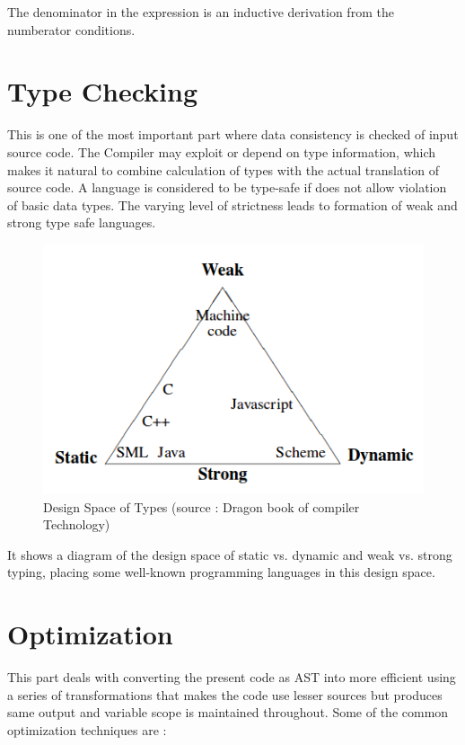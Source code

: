 The denominator in the expression is an inductive derivation from the numberator conditions.

\section{Type Checking}
This is one of the most important part where data consistency is checked of input source code. The Compiler may exploit or depend on type information, which makes it natural to combine calculation of types with the actual translation of source code. A language is considered to be type-safe if does not allow violation of basic data types. The varying level of strictness leads to formation of weak and strong type safe languages.\\

\begin{figure}[!htb]
\centering
  \includegraphics[scale=0.5]{type_check}
  \caption{Design Space of Types (source : Dragon book of compiler Technology)}
\end{figure}

It shows a diagram of the design space of static vs. dynamic and weak vs. strong typing, placing some well-known programming languages in this design space.

\section{Optimization}

This part deals with converting the present code as AST into more efficient using a series of transformations that makes the code use lesser sources but produces same output and variable scope is maintained throughout. Some of the common optimization techniques are :\\

